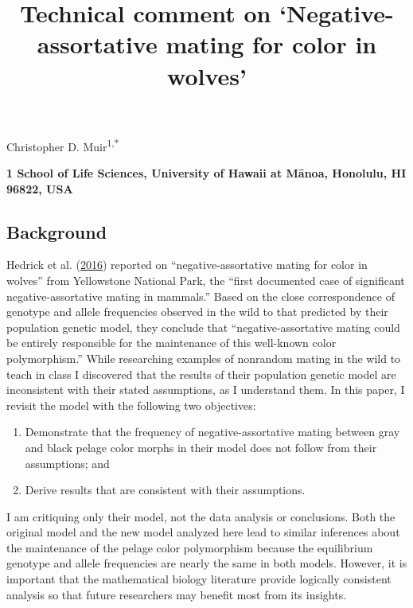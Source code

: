 \documentclass[
]{article}
\title{Technical comment on `Negative-assortative mating for color in wolves'}
\author{}
\date{\vspace{-2.5em}}
\providecommand{\tightlist}{%
  \setlength{\itemsep}{0pt}\setlength{\parskip}{0pt}}
\begin{document}
\maketitle

\begin{centering}
Christopher D. Muir\textsuperscript{1,*}

\bf{1} School of Life Sciences, University of Hawaii at M\=anoa, Honolulu, HI 96822, USA
\end{centering}

\hypertarget{background}{%
\subsection{Background}\label{background}}

Hedrick et al. (\protect\hyperlink{ref-hedrick_negative-assortative_2016}{2016}) reported on ``negative-assortative mating for color in wolves'' from Yellowstone National Park, the ``first documented case of significant negative-assortative mating in mammals.'' Based on the close correspondence of genotype and allele frequencies observed in the wild to that predicted by their population genetic model, they conclude that ``negative-assortative mating could be entirely responsible for the maintenance of this well-known color polymorphism.'' While researching examples of nonrandom mating in the wild to teach in class I discovered that the results of their population genetic model are inconsistent with their stated assumptions, as I understand them. In this paper, I revisit the model with the following two objectives:

\begin{enumerate}
\def\labelenumi{\arabic{enumi}.}
\tightlist
\item
  Demonstrate that the frequency of negative-assortative mating between gray and black pelage color morphs in their model does not follow from their assumptions; and
\item
  Derive results that are consistent with their assumptions.
\end{enumerate}

I am critiquing only their model, not the data analysis or conclusions. Both the original model and the new model analyzed here lead to similar inferences about the maintenance of the pelage color polymorphism because the equilibrium genotype and allele frequencies are nearly the same in both models. However, it is important that the mathematical biology literature provide logically consistent analysis so that future researchers may benefit most from its insights.
\end{document}
